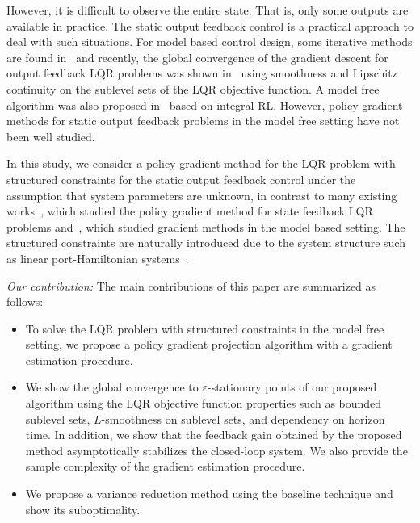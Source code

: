 
However, it is difficult to observe the entire state.
That is, only some outputs are available in practice.
The static output feedback control is a practical approach to deal with such situations.
For model based control design, some iterative methods are found in~\cite{makila1987computational}
and recently, the global convergence of the gradient descent for output feedback LQR problems was shown in~\cite{fatkhullin2021optimizing} using smoothness and Lipschitz continuity on the sublevel sets of the LQR objective function.
A model free algorithm was also proposed in~\cite{zhu2015adaptive} based on integral RL.
However, policy gradient methods for static output feedback problems in the model free setting have not been well studied.


In this study, we consider a policy gradient method for the LQR problem with structured constraints
for the static output feedback control under the assumption that system parameters are unknown,
in contrast to many existing works~\cite{fazel2018global, mohammadi2021convergence, hambly2021policy}, which studied the policy gradient method for state feedback LQR problems and~\cite{fatkhullin2021optimizing}, which studied gradient methods in the model based setting.
The structured constraints are naturally introduced due to the system structure such as linear port-Hamiltonian systems~\cite{Jacob2012linear}.

{\it Our contribution:}
The main contributions of this paper are summarized as follows:
\begin{itemize}
    \item To solve the LQR problem with structured constraints in the model free setting, we propose a policy gradient projection algorithm with a gradient estimation procedure.
    \item We show the global convergence to $\varepsilon$-stationary points of our proposed algorithm using the LQR objective function properties such as bounded sublevel sets, $L$-smoothness on sublevel sets, and dependency on horizon time.
    In addition, we show that the feedback gain obtained by the proposed method asymptotically stabilizes the closed-loop system.
    We also provide the sample complexity of the gradient estimation procedure.
    \item We propose a variance reduction method using the baseline technique and show its suboptimality.
\end{itemize}


